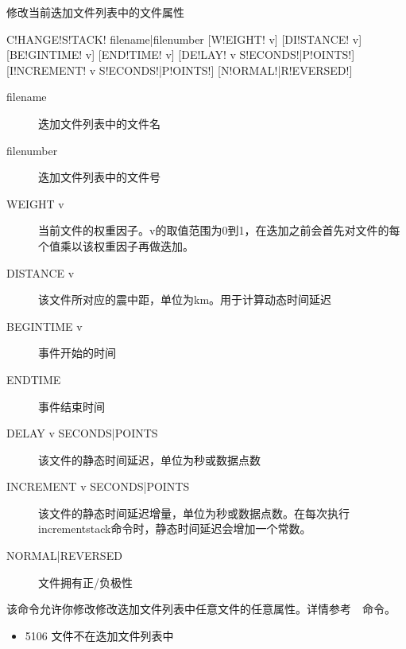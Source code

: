 \label{sss:changestack}

修改当前迭加文件列表中的文件属性

\begin{SACSTX}
    C!HANGE!S!TACK! filename|filenumber [W!EIGHT! v] [DI!STANCE! v]
        [BE!GINTIME! v] [END!TIME! v] [DE!LAY! v S!ECONDS!|P!OINTS!]
        [I!NCREMENT! v S!ECONDS!|P!OINTS!] [N!ORMAL!|R!EVERSED!]
\end{SACSTX}

\begin{description}
\item [filename] 迭加文件列表中的文件名
\item [filenumber] 迭加文件列表中的文件号
\item [WEIGHT v] 当前文件的权重因子。v的取值范围为0到1，在迭加之前会首先对文件的每个值乘以该权重因子再做迭加。
\item [DISTANCE v] 该文件所对应的震中距，单位为km。用于计算动态时间延迟
\item [BEGINTIME v] 事件开始的时间
\item [ENDTIME] 事件结束时间
\item [DELAY v SECONDS|POINTS] 该文件的静态时间延迟，单位为秒或数据点数
\item [INCREMENT v SECONDS|POINTS] 该文件的静态时间延迟增量，单位为秒或数据点数。在每次执行incrementstack命令时，静态时间延迟会增加一个常数。
\item [NORMAL|REVERSED] 文件拥有正/负极性
\end{description}

\SACTitle{}
该命令允许你修改修改迭加文件列表中任意文件的任意属性。详情参考~~命令。

\begin{itemize}
\item 5106 文件不在迭加文件列表中
\end{itemize}

